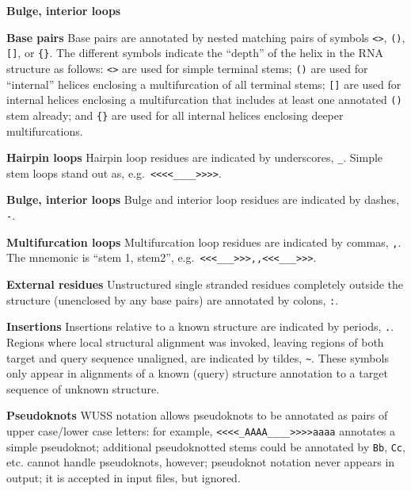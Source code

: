 \begin{sreitems}{\textbf{Bulge, interior loops}}
\item[\textbf{Base pairs}]
  Base pairs are annotated by nested matching pairs of symbols
  \verb+<>+, \verb+()+, \verb+[]+, or \verb+{}+.
  The different symbols indicate the ``depth'' of the
  helix in the RNA structure as follows:
  \verb+<>+ are used for simple terminal stems; 
  \verb+()+ are used for ``internal'' helices enclosing a multifurcation of
  all terminal stems; \verb+[]+ are used for internal helices 
  enclosing a multifurcation that includes at least one annotated
  \verb+()+ stem already; and \verb+{}+ are used for all internal
  helices enclosing deeper multifurcations.
   
\item[\textbf{Hairpin loops}]
  Hairpin loop residues are indicated by underscores, \verb+_+.
  Simple stem loops stand out as, e.g.\ \verb+<<<<____>>>>+.

\item[\textbf{Bulge, interior loops}]
  Bulge and interior loop residues are indicated by dashes, \verb+-+.
  
\item[\textbf{Multifurcation loops}]
  Multifurcation loop residues are indicated by commas, \verb+,+.
  The mnemonic is ``stem 1, stem2'', e.g.\ \verb+<<<___>>>,,<<<___>>>+.

\item[\textbf{External residues}]
  Unstructured single stranded residues completely outside the
  structure (unenclosed by any base pairs) are annotated by
  colons, \verb+:+.

\item[\textbf{Insertions}]
  Insertions relative to a known structure are indicated by periods,
  \verb+.+. Regions where local structural alignment was invoked,
  leaving regions of both target and query sequence unaligned,
  are indicated by tildes, \verb+~+. These symbols only appear in
  alignments of a known (query) structure annotation to a target
  sequence of unknown structure.

\item[\textbf{Pseudoknots}]
  WUSS notation allows pseudoknots to be annotated as pairs of
  upper case/lower case letters: for example,
  \verb+<<<<_AAAA____>>>>aaaa+ annotates a simple pseudoknot;
  additional pseudoknotted stems could be annotated by \verb+Bb+,
  \verb+Cc+, etc.  cannot handle pseudoknots, however;
  pseudoknot notation never appears in  output; it
  is accepted in input files, but ignored.
\end{sreitems}

